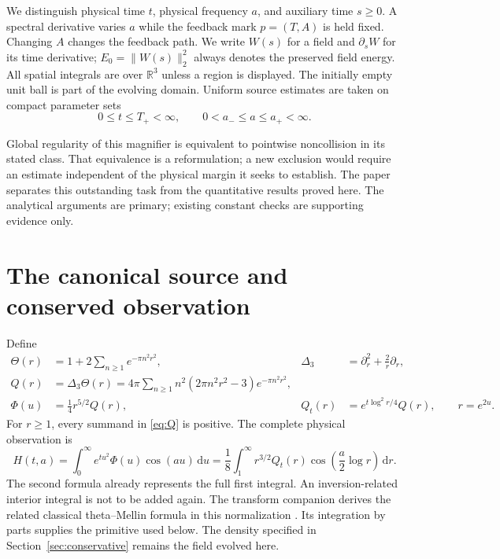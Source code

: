 \documentclass[11pt]{article}
\numberwithin{equation}{section}
\newcommand{\dd}{\,\mathrm d}
\newcommand{\R}{\mathbb R}
\begin{document}
We distinguish physical time $t$, physical frequency $a$, and auxiliary
time $s\ge0$. A spectral derivative varies $a$ while the feedback mark
$p=(T,A)$ is held fixed. Changing $A$ changes the feedback path.
We write $W(s)$ for a field and $\partial_sW$ for its time derivative;
$E_0=\|W(s)\|_2^2$ always denotes the preserved field energy.
All spatial integrals are over $\R^3$ unless a region is displayed.
The initially empty unit ball is part of the evolving domain.
Uniform source estimates are taken on compact parameter sets
\begin{equation}\label{eq:domain}
 0\le t\le T_+<\infty,\qquad
 0<a_-\le a\le a_+<\infty.
\end{equation}

Global regularity of this magnifier is equivalent to pointwise
noncollision in its stated class. That equivalence is a reformulation;
a new exclusion would require an estimate independent of the physical
margin it seeks to establish. The paper separates this outstanding
task from the quantitative results proved here. The analytical
arguments are primary; existing constant checks are supporting
evidence only.


\section{The canonical source and conserved observation}\label{sec:canonical}

Define
\begin{align}
\Theta(r)&=1+2\sum_{n\ge1}e^{-\pi n^2r^2},
&\Delta_3&=\partial_r^2+\frac2r\partial_r,\label{eq:theta}\\
Q(r)&=\Delta_3\Theta(r)
=4\pi\sum_{n\ge1}n^2(2\pi n^2r^2-3)e^{-\pi n^2r^2},\label{eq:Q}\\
\Phi(u)&=\frac14r^{5/2}Q(r),
&Q_t(r)&=e^{t\log^2r/4}Q(r),\qquad r=e^{2u}.\label{eq:fullthetaflow}
\end{align}
For $r\ge1$, every summand in \eqref{eq:Q} is positive. The complete
physical observation is
\begin{equation}\label{eq:H}
H(t,a)=\int_0^\infty e^{tu^2}\Phi(u)\cos(au)\dd u
=\frac18\int_1^\infty r^{3/2}Q_t(r)
             \cos\!\left(\frac a2\log r\right)\dd r.
\end{equation}
The second formula already represents the full first integral. An
inversion-related interior integral is not to be added again.
The transform companion derives the related classical theta--Mellin
formula in this normalization \cite{ThetaCompanion}. Its integration by
parts supplies the primitive used below. The density specified in
Section~\ref{sec:conservative} remains the field evolved here.
\end{document}
